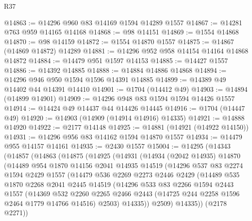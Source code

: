 \begin{lexlean}{R37}
\begin{coremodule}
@14863 := @14296 @960 @83 @14169 @1594 @14289 @1557
@14867 := @14281 @763 @959 @14165 @14168
@14868 := @98 @14151
@14869 := @1554 @14868
@14870 := @98 @14159
@14872 := @1554 @14870 @1557
@14875 := @14867 (@14869 @14872) @14289
@14881 := @14296 @952 @958 @14154 @14164 @14868 @14872
@14884 := @14479 @951 @1597 @14153
@14885 := @14427 @1557
@14886 := @14392 @14885
@14888 := @14884 @14886 @14868
@14894 := @14296 @946 @950 @1594 @1596 @14391 @14885
@14899 := @14389 @49 @14402 @44 @14391 @14410
@14901 := @1704 (@14412 @49)
@14903 := @14894 (@14899 @14901)
@14909 := @14296 @948 @83 @1594 @1594 @14426 @1557
@14914 := @14424 @49 @14437 @44 @14426 @14445
@14916 := @1704 (@14447 @49)
@14920 := @14903 (@14909 (@14914 @14916) @14335)
@14921 := @14888 @14920
@14922 := @2177 @14148
@14925 := @14881 (@14921 (@14922 @14150))
@14931 := @14296 @956 @83 @14162 @1594 @14870 @1557
@14934 := @14479 @955 @14157 @14161
@14935 := @2430 @1557
@15004 := @14295
    (@14343
      (@14857
        (@14863
          (@14875
            (@14925
              (@14931
                (@14934
                  (@2042 @14935)
                  @14870
                  (@14489
                    @954
                    @1870
                    @14156
                    @2041
                    @14935
                    @14519
                    (@14296
                      @537
                      @83
                      @2274
                      @1594
                      @2429
                      @1557
                      (@14479
                        @536
                        @2269
                        @2273
                        @2446
                        @2429
                        (@14489
                          @535
                          @1870
                          @2268
                          @2041
                          @2445
                          @14519
                          (@14296
                            @533
                            @83
                            @2266
                            @1594
                            @2443
                            @1557
                            (@14369
                              @532
                              @2260
                              @2265
                              @2466
                              @2443
                              (@14725 @244 @2258 @1596 @2464 @1779 @14766 @14516)
                              @2503)
                            @14335))
                        @2509)
                      @14335))
                  (@2178 @2271))

\end{coremodule}
\end{lexlean}

